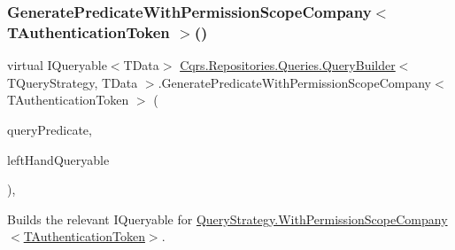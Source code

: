 \subsubsection{\texorpdfstring{Generate\+Predicate\+With\+Permission\+Scope\+Company$<$ T\+Authentication\+Token $>$()}{GeneratePredicateWithPermissionScopeCompany< TAuthenticationToken >()}}
{\footnotesize\ttfamily virtual I\+Queryable$<$T\+Data$>$ \hyperlink{classCqrs_1_1Repositories_1_1Queries_1_1QueryBuilder}{Cqrs.\+Repositories.\+Queries.\+Query\+Builder}$<$ T\+Query\+Strategy, T\+Data $>$.Generate\+Predicate\+With\+Permission\+Scope\+Company$<$ T\+Authentication\+Token $>$ (\begin{DoxyParamCaption}\item[{\hyperlink{classCqrs_1_1Repositories_1_1Queries_1_1QueryPredicate}{Query\+Predicate}}]{query\+Predicate,  }\item[{I\+Queryable$<$ T\+Data $>$}]{left\+Hand\+Queryable }\end{DoxyParamCaption})\hspace{0.3cm}{\ttfamily [protected]}, {\ttfamily [virtual]}}



Builds the relevant I\+Queryable for \hyperlink{classCqrs_1_1Repositories_1_1Queries_1_1QueryStrategy_a822a0901976ceadb3f096326860e3006_a822a0901976ceadb3f096326860e3006}{Query\+Strategy.\+With\+Permission\+Scope\+Company$<$\+T\+Authentication\+Token$>$}. 

\mbox{\label{classCqrs_1_1Repositories_1_1Queries_1_1QueryBuilder_a49c0626c4137be11afbb1e398294e474_a49c0626c4137be11afbb1e398294e474}} 

